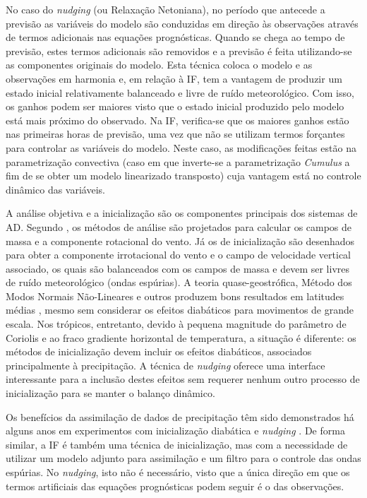 No caso do \textit{nudging} (ou Relaxação Netoniana), no período que antecede a previsão as variáveis do modelo são conduzidas em direção às observações através de termos adicionais nas equações prognósticas. Quando se chega ao tempo de previsão, estes termos adicionais são removidos e a previsão é feita utilizando-se as componentes originais do modelo. Esta técnica coloca o modelo e as observações em harmonia e, em relação à IF, tem a vantagem de produzir um estado inicial relativamente balanceado e livre de ruído meteorológico. Com isso, os ganhos podem ser maiores visto que o estado inicial produzido pelo modelo está mais próximo do observado. Na IF, verifica-se que os maiores ganhos estão nas primeiras horas de previsão, uma vez que não se utilizam termos forçantes para controlar as variáveis do modelo. Neste caso, as modificações feitas estão na parametrização convectiva (caso em que inverte-se a parametrização \textit{Cumulus} a fim de se obter um modelo linearizado transposto) cuja vantagem está no controle dinâmico das variáveis.

A análise objetiva e a inicialização são os componentes principais dos sistemas de AD. Segundo , os métodos de análise são projetados para calcular os campos de massa e a componente rotacional do vento. Já os de inicialização são desenhados para obter a componente irrotacional do vento e o campo de velocidade vertical associado, os quais são balanceados com os campos de massa e devem ser livres de ruído meteorológico (ondas espúrias). A teoria quase-geostrófica, Método dos Modos Normais Não-Lineares e outros produzem bons resultados em latitudes médias \cite{krishnamurtietal91}, mesmo sem considerar os efeitos diabáticos para movimentos de grande escala. Nos trópicos, entretanto, devido à pequena magnitude do parâmetro de Coriolis e ao fraco gradiente horizontal de temperatura, a situação é diferente: os métodos de inicialização devem incluir os efeitos diabáticos, associados principalmente à precipitação. A técnica de \textit{nudging} oferece uma interface interessante para a inclusão destes efeitos sem requerer nenhum outro processo de inicialização para se manter o balanço dinâmico.

Os benefícios da assimilação de dados de precipitação têm sido demonstrados há alguns anos em experimentos com inicialização diabática e \textit{nudging} \cite{zupanskimesinger95}. De forma similar, a IF é também uma técnica de inicialização, mas com a necessidade de utilizar um modelo adjunto para assimilação e um filtro para o controle das ondas espúrias. No \textit{nudging}, isto não é necessário, visto que a única direção em que os termos artificiais das equações prognósticas podem seguir é o das observações.


